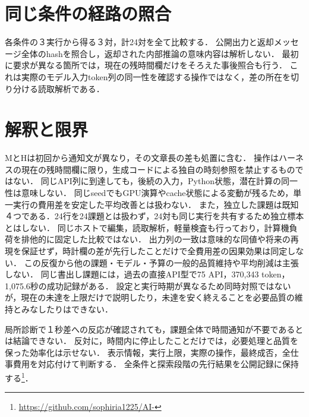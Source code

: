\documentclass[uplatex,a4paper,twocolumn,10pt]{jsarticle}
\begin{document}
\section{同じ条件の経路の照合}
各条件の３実行から得る３対，計24対を全て比較する．
公開出力と返却メッセージ全体のhashを照合し，返却された内部推論の意味内容は解析しない．
最初に要求が異なる箇所では，現在の残時間欄だけをそろえた事後照合も行う．
これは実際のモデル入力token列の同一性を確認する操作ではなく，差の所在を切り分ける読取解析である．


\section{解釈と限界}
MとHは初回から通知文が異なり，その文章長の差も処置に含む．
操作はハーネスの現在の残時間欄に限り，生成コードによる独自の時刻参照を禁止するものではない．
同じAPI列に到達しても，後続の入力，Python状態，潜在計算の同一性は意味しない．
同じseedでもGPU演算やcache状態による変動が残るため，単一実行の費用差を安定した平均改善とは扱わない．
また，独立した課題は既知４つである．24行を24課題とは扱わず，24対も同じ実行を共有するため独立標本とはしない．
同じホストで編集，読取解析，軽量検査も行っており，計算機負荷を排他的に固定した比較ではない．
出力列の一致は意味的な同値や将来の再現を保証せず，時計欄の差が先行したことだけで全費用差の因果効果は同定しない．
この反復から他の課題・モデル・予算の一般的品質維持や平均削減は主張しない．
同じ書出し課題には，過去の直接API型で75 API，370,343 token，1,075.6秒の成功記録がある．
設定と実行時期が異なるため同時対照ではないが，現在の未達を上限だけで説明したり，未達を安く終えることを必要品質の維持とみなしたりはできない．

局所診断で１秒差への反応が確認されても，課題全体で時間通知が不要であるとは結論できない．
反対に，時間内に停止したことだけでは，必要処理と品質を保った効率化は示せない．
表示情報，実行上限，実際の操作，最終成否，全仕事費用を対応付けて判断する．
全条件と探索段階の先行結果を公開記録に保持する\footnote{\url{https://github.com/sophiria1225/AI-}}．
\end{document}
